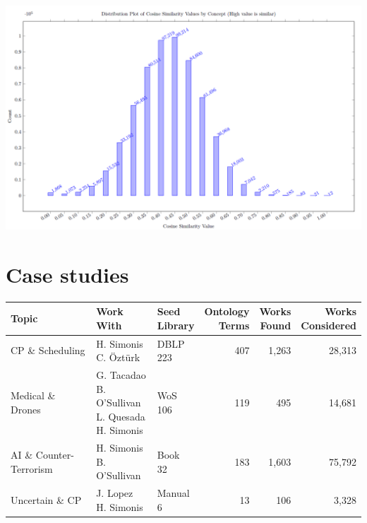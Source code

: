 \documentclass[final,hyperref={pdfpagelabels=false}]{beamer}
\begin{document}
\begin{frame}{}
\begin{multicols}{2}
\includegraphics[width=35cm]{images/similaritydistributioncosine}

\section{Case studies}
\begin{tabular}{lllrrr}\toprule
Topic & \shortstack{Work\\With} & \shortstack{Seed\\Library} & \shortstack{Ontology\\Terms} & \shortstack{Works\\Found} & \shortstack{Works\\Considered}\\ \midrule 
CP \& Scheduling &\shortstack[l]{H. Simonis\\C. Öztürk}  & \shortstack[l]{DBLP\\223}& 407 & 1,263 & 28,313\\\midrule 
Medical \& Drones & \shortstack[l]{G. Tacadao\\B. O'Sullivan\\L. Quesada\\H. Simonis} & \shortstack[l]{WoS\\106} & 119& 495 & 14,681\\\midrule 
AI \& Counter-Terrorism & \shortstack[l]{H. Simonis\\B. O'Sullivan} & \shortstack[l]{Book\\32} & 183 & 1,603 & 75,792\\\midrule
Uncertain \& CP & \shortstack[l]{J. Lopez\\H. Simonis} & \shortstack[l]{Manual\\6} & 13 & 106 & 3,328\\
\bottomrule
\end{tabular} 


\end{multicols}
\end{frame}
\end{document}
